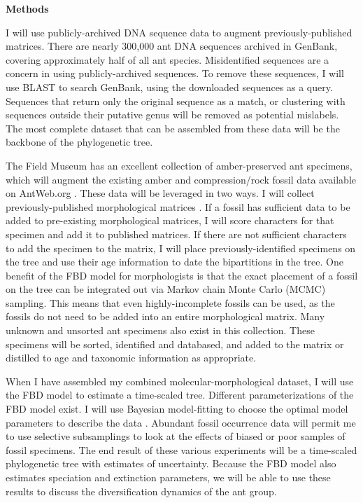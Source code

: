 \documentclass[]{article}
\begin{document}
\textbf{Methods} \par
I will use publicly-archived DNA sequence data to augment previously-published matrices. There are nearly 300,000 ant DNA sequences archived in GenBank, covering approximately half of all ant species. Misidentified sequences are a concern in using publicly-archived sequences. To remove these sequences, I will use BLAST \citep{altschul1990basic} to search GenBank, using the  downloaded sequences as a query. Sequences that return only the original sequence as a match, or clustering with sequences outside their putative genus will be removed as potential mislabels. The most complete dataset that can be assembled from these data will be the backbone of the phylogenetic tree.  \par
The Field Museum has an excellent collection of amber-preserved ant specimens, which will augment the existing amber and compression/rock fossil data available on AntWeb.org \citep{ ref87}. These data will be leveraged in two ways. I will collect previously-published morphological matrices \citep{grimaldi1997new, brady2005morphological}. If a fossil has sufficient data to be added to pre-existing morphological matrices,  I will score characters for that specimen and add it to published matrices. If there are not sufficient characters to add the specimen to the matrix, I will place previously-identified specimens on the tree and use their age information to date the bipartitions in the tree. One benefit of the FBD model for morphologists is that the exact placement of a fossil on the tree can be integrated out via Markov chain Monte Carlo (MCMC) sampling. This means that even highly-incomplete fossils can be used, as the fossils do not need to be added into an entire morphological matrix. Many unknown and unsorted ant specimens also exist in this collection. These specimens will be sorted, identified and databased, and added to the matrix or distilled to age and taxonomic information as appropriate.  \par
When I have assembled my combined molecular-morphological dataset, I will use the FBD model to estimate a time-scaled tree. Different parameterizations of the FBD model exist. I will use Bayesian model-fitting to choose the optimal model parameters to describe the data \citep{baele2012improving}. Abundant fossil occurrence data will permit me to use selective subsamplings to look at the effects of biased or poor samples of fossil specimens.  The end result of these various experiments will be a time-scaled phylogenetic tree with estimates of uncertainty. Because the FBD model also estimates speciation and extinction parameters, we will be able to use these results to discuss the diversification dynamics of the ant group. \par
\end{document}
